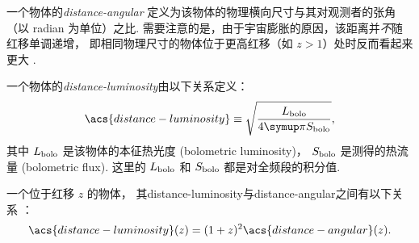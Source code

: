 一个物体的\emph{\acf{distance-angular}}
定义为该物体的物理横向尺寸与其对观测者的张角（以 \si{radian} 为单位）之比.
需要注意的是，由于宇宙膨胀的原因，该距离并\emph{不}随红移单调递增，
即相同物理尺寸的物体位于更高红移（如 $z > 1$）处时反而看起来更大 \cite{hogg1999}.

一个物体的\emph{\acf{distance-luminosity}}由以下关系定义：
\begin{equation}
  \label{eq:dl-def}
  \acs{distance-luminosity} \equiv
    \sqrt{\frac{L_{\R{bolo}}}{4\Cpi S_{\R{bolo}}}} ,
\end{equation}
其中 $L_{\mathrm{bolo}}$ 是该物体的本征热光度 (bolometric luminosity)，
$S_{\mathrm{bolo}}$ 是测得的热流量 (bolometric flux).
这里的 $L_{\mathrm{bolo}}$ 和 $S_{\mathrm{bolo}}$ 都是对全频段的积分值.

一个位于红移 $z$ 的物体，
其\acl{distance-luminosity}与\acl{distance-angular}之间有以下关系
\cite{weinberg1972,hogg1999,ellis2007}：
\begin{equation}
  \label{eq:dl-da}
  \acs{distance-luminosity}(z) = (1+z)^2 \acs{distance-angular}(z) .
\end{equation}


